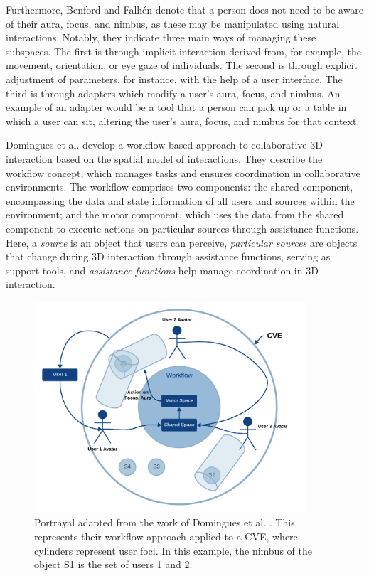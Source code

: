     Furthermore, Benford and Falhén \cite{benfordSpatialModelInteraction1993} denote that a person does not need to be aware of their aura, focus, and nimbus, as these may be manipulated using natural interactions. Notably, they indicate three main ways of managing these subspaces. The first is through implicit interaction derived from, for example, the movement, orientation, or eye gaze of individuals. The second is through explicit adjustment of parameters, for instance, with the help of a user interface. The third is through adapters which modify a user's aura, focus, and nimbus. An example of an adapter would be a tool that a person can pick up or a table in which a user can sit, altering the user's aura, focus, and nimbus for that context.

    Domingues et al. \cite{dominguesCollaborative3DInteraction2011} develop a workflow-based approach to collaborative 3D interaction based on the spatial model of interactions. They describe the workflow concept, which manages tasks and ensures coordination in collaborative environments. The workflow comprises two components: the shared component, encompassing the data and state information of all users and sources within the environment; and the motor component, which uses the data from the shared component to execute actions on particular sources through assistance functions. Here, a \textit{source} is an object that users can perceive, \textit{particular sources} are objects that change during 3D interaction through assistance functions, serving as support tools, and \textit{assistance functions} help manage coordination in 3D interaction.

    \begin{figure}[h]
        \centering
        \includegraphics[width=0.9\textwidth]{figures/spatial_model.png}
        \caption{Portrayal adapted from the work of Domingues et al. \cite{dominguesCollaborative3DInteraction2011}. This represents their workflow approach applied to a CVE, where cylinders represent user foci. In this example, the nimbus of the object S1 is the set of users 1 and 2. }
        \label{fig:spatial_model}
    \end{figure}

